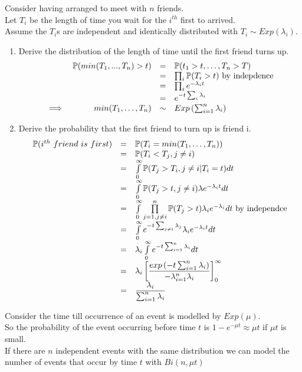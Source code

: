 \documentclass[11pt,a4paper]{article}
\begin{document}
Consider having arranged to meet with $n$ friends.\\
Let $T_i$ be the length of time you wait for the $i^{th}$ first to arrived.\\
Assume the $T_i$s are independent and identically distributed with $T_i\sim Exp(\lambda_i)$.\\
\begin{enumerate}[label=\roman*)]
	\item Derive the distribution of the length of time until the first friend turns up.
	\[\begin{array}{rrcl}
		&\prob(min(T_1,...,T_n)>t)&=&\prob(t_1>t,\dots,T_n>T)\\
		&&=&\prod_i\prob(T_i>t)\mathrm{\ by\ indepdence}\\
		&&=&\prod_ie^{-\lambda_it}\\
		&&=&e^{-t\sum_i\lambda_i}\\
		\implies&min(T_1,\dots,T_n)&\sim&Exp\left(\sum_{i=1}^n\lambda_i\right)
	\end{array}\]
	\item Derive the probability that the first friend to turn up is friend i.\\
	\[\begin{array}{rcl}
	\prob(i^{th}\ friend\ is\ first)&=&\prob(T_i=min(T_1,\dots,T_n))\\
	&=&\prob(T_i<T_j,j\neq i)\\
	&=&\int\limits_0^\infty\prob(T_j>T_i,j\neq i|T_i=t)dt\\
	&=&\int\limits_0^\infty\prob(T_j>t,j\neq i)\lambda e^{-\lambda_it}dt\\
	&=&\int\limits_0^\infty\prod\limits_{j=1,j\neq i}^n\prob(T_j>t)\lambda_ie^{-\lambda_i}dt\mathrm{\ by\ independce}\\
	&=&\int\limits_0^\infty e^{-t\sum_{j\neq i}\lambda_j}\lambda_ie^{-\lambda_it}dt\\
	&=&\lambda_i\int\limits_0^\infty e^{-t\sum_{i=1}^n\lambda_i}dt\\
	&=&\lambda_i\left[\dfrac{exp\left(-t\sum_{i=1}^n\lambda_i\right)}{-\lambda_{i=1}^n\lambda_i}\right]_0^\infty\\
	&=&\dfrac{\lambda_i}{\sum_{i=1}^n\lambda_i}
	\end{array}\]
\end{enumerate}

Consider the time till occurrence of an event is modelled by $Exp(\mu)$.\\
So the probability of the event occurring before time $t$ is $1-e^{-\mu t}\approx\mu t$ if $\mu t$ is small.\\
If there are $n$ independent events with the same distribution we can model the number of events that occur by time $t$ with $Bi(n,\mu t)$
\end{document}
